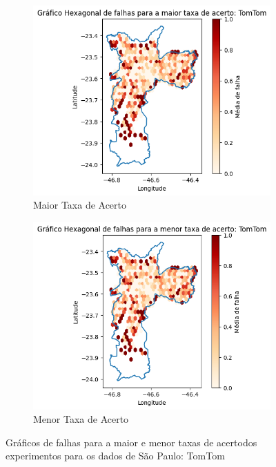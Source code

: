 \begin{figure}[ht]
    \centering
    \begin{subfigure}[b]{0.45\textwidth}
      \includegraphics[width=\textwidth]{Figuras/expFalhasTomtommaiorSP.png}
      \caption{Maior Taxa de Acerto}
      \label{fig:falhastomtomBHexpMaiorSP}
    \end{subfigure}
    \hfill
    \begin{subfigure}[b]{0.45\textwidth}
      \includegraphics[width=\textwidth]{Figuras/expFalhasTomtommenorSP.png}
      \caption{Menor Taxa de Acerto}
      \label{fig:falhastomtomBHexpMenorSP}
    \end{subfigure}
    
    \caption{Gráficos de falhas para a maior e menor taxas de acertodos experimentos para os dados de São Paulo: TomTom}
    \label{fig:falhas-exp-tomtom-sp}
\end{figure}


